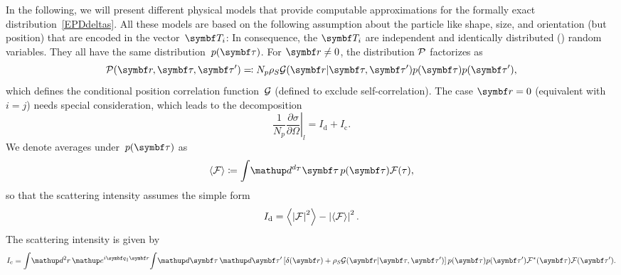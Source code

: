 In the following, we will present different physical models
that provide computable approximations
for the formally exact distribution~\cref{EPDdeltas}.
All these models are based on the following assumption
about the particle  like shape, size, and orientation
(but  position) that are  encoded in the vector~$\v T_i$:
%
In consequence, the $\v T_i$
are independent and identically distributed () random variables.
They all have the same distribution~$p(\v\tau)$.
For $\r\ne0$, the distribution $\mathcal{P}$ factorizes as
\begin{equation}
  \PD(\r,\v\tau,\v\tau')\eqqcolon N_p \rho_S \GD(\r|\v\tau,\v\tau')p(\v\tau)p(\v\tau'),
\end{equation}
which defines the conditional position correlation function~$\mathcal{G}$ (defined to exclude self-correlation).
The case $\r=0$ (equivalent with $i=j$) needs special consideration,
which leads to the decomposition
\Emph
{\begin{equation}
  \frac{1}{N_p}\left.\frac{\partial\sigma}{\partial\Omega}\right|_l
  = I_\text{d}+I_\text{c}.
\end{equation}\vskip -5pt}
We denote averages under~$p(\v\tau)$ as
\begin{equation}
  \bra\FD\ket \coloneqq  \int\!\d^{d_T}\v\tau\,p(\v\tau)\FD(\tau),
\end{equation}
so that the  scattering intensity assumes the simple form
%
%
\Emph
{\begin{equation}
  I_\text{d} = \left\langle\left|\mathcal{F}\right|^2\right\rangle-\left|\left\langle\mathcal{F}\right\rangle\right|^2.
\end{equation}\vskip -5pt}
The  scattering intensity is given by
\Emph
{\begin{equation}\label{EICoherent}
  I_\text{c} =
  \int\!\d^2r\,   \e^{i\q_{\plll}\r}\!
  \int\! \d\v{\tau}\, \d\v{\tau}'
  \left[\delta(\r)+\rho_S \GD(\r|\v\tau,\v\tau')\right]p(\v\tau)p(\v\tau')
    \FD^*(\v\tau) \FD(\v\tau').
\end{equation}\vskip -5pt}

